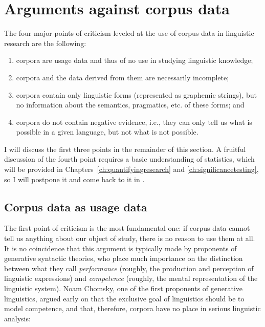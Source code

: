 \section{Arguments against corpus data}\label{sec:argumentsagainstcorpusdata}\largerpage

The four major points of criticism leveled at the use of corpus data in linguistic research are the following:

\begin{enumerate}
\item corpora are usage data and thus of no use in studying linguistic knowledge;
\item corpora and the data derived from them are necessarily incomplete;
\item corpora contain only linguistic forms (represented as graphemic strings), but no information about the semantics,  pragmatics,  etc. of these forms; and
\item corpora do not contain negative evidence,  i.e., they can only tell us what is possible in a given language, but not what is not possible.
\end{enumerate}

I will discuss the first three points in the remainder of this section. A fruitful discussion of the fourth point requires a basic understanding of statistics,  which will be provided in Chapters~\ref{ch:quantifyingresearch} and \ref{ch:significancetesting}, so I will postpone it and come back to it in .

\subsection{Corpus data as usage data}\label{sec:corpusdataasusagedata}\largerpage

The first point of criticism is the most fundamental one: if corpus data cannot tell us anything about our object of study, there is no reason to use them at all. It is no coincidence that this argument is typically made by proponents of generative  syntactic  theories, who place much importance on the distinction between what they call \textit{performance}  (roughly, the production and perception of linguistic expressions) and \textit{competence}  (roughly, the mental representation of the linguistic system). Noam Chomsky, one of the first proponents of generative  linguistics, argued early on that the exclusive goal of linguistics should be to model competence, and that, therefore, corpora have no place in serious linguistic analysis:

